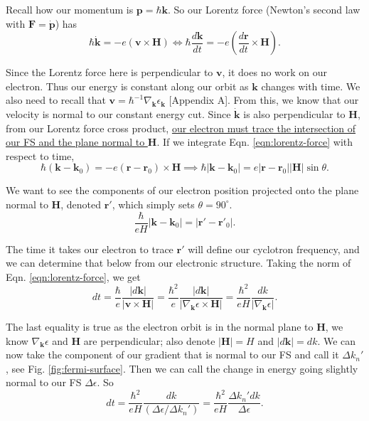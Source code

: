 \documentclass[12pt]{revtex4-2}
\begin{document}
Recall how our momentum is $\mathbf{p} = \hbar\mathbf{k}$.  So our Lorentz force (Newton's second law with $\mathbf{F} = \dot{\mathbf{p}}$) has
\begin{equation}\label{eqn:lorentz-force}
    \hbar\dot{\mathbf{k}} = -e (\mathbf{v} \times \mathbf{H}) \iff \hbar\frac{d\mathbf{k}}{dt} = -e\left( \frac{d\mathbf{r}}{dt} \times \mathbf{H} \right).
\end{equation}

Since the Lorentz force here is perpendicular to $\mathbf{v}$, it does no work on our electron.  Thus our energy is constant along our orbit as $\mathbf{k}$ changes with time.  We also need to recall that $\mathbf{v} = \hbar^{-1}\nabla_\mathbf{k}\epsilon_\mathbf{k}$ [Appendix A].  From this, we know that our velocity is normal to our constant energy cut.  Since $\dot{\mathbf{k}}$ is also perpendicular to $\mathbf{H}$, from our Lorentz force cross product, \underline{our electron must trace the intersection of our FS and the plane normal to $\mathbf{H}$}.  If we integrate Eqn. \ref{eqn:lorentz-force} with respect to time, 
\begin{equation}
    \hbar(\mathbf{k} - \mathbf{k}_0) = -e(\mathbf{r} - \mathbf{r}_0)\times\mathbf{H} \implies \hbar|\mathbf{k} - \mathbf{k}_0| = e|\mathbf{r} - \mathbf{r}_0||\mathbf{H}|\sin\theta.
\end{equation}

We want to see the components of our electron position projected onto the plane normal to $\mathbf{H}$, denoted $\mathbf{r}'$, which simply sets $\theta = 90^\circ$.
\begin{equation}
    \frac{\hbar}{eH}|\mathbf{k} - \mathbf{k}_0| = |\mathbf{r}' - \mathbf{r}'_0|.
\end{equation}

The time it takes our electron to trace $\mathbf{r}'$ will define our cyclotron frequency, and we can determine that below from our electronic structure. Taking the norm of Eqn. \ref{eqn:lorentz-force}, we get 
\begin{equation}
    dt = \frac{\hbar}{e} \frac{|d\mathbf{k}|}{|\mathbf{v}\times\mathbf{H}|} = \frac{\hbar^2}{e} \frac{|d\mathbf{k}|}{|\nabla_\mathbf{k}\epsilon \times \mathbf{H}|} = \frac{\hbar^2}{eH} \frac{dk}{|\nabla_\mathbf{k}\epsilon|}.
\end{equation}

The last equality is true as the electron orbit is in the normal plane to $\mathbf{H}$, we know $\nabla_\mathbf{k}\epsilon$ and $\mathbf{H}$ are perpendicular; also denote $|\mathbf{H}| = H$ and $|d\mathbf{k}| = dk$.  We can now take the component of our gradient that is normal to our FS and call it $\Delta k_n'$, see Fig. \ref{fig:fermi-surface}.  Then we can call the change in energy going slightly normal to our FS $\Delta \epsilon$.  So 
\begin{equation}
    dt = \frac{\hbar^2}{eH} \frac{dk}{(\Delta \epsilon / \Delta k_n')} = \frac{\hbar^2}{eH} \frac{\Delta k_n' dk}{\Delta \epsilon}.
\end{equation}
\end{document}
